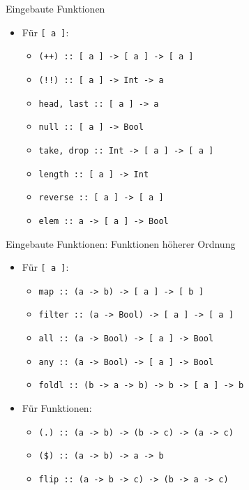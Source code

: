\documentclass{beamer}
\begin{document}
\begin{frame}{Eingebaute Funktionen}
	\begin{itemize}
		\item Für \texttt{[ a ]}:
		\begin{itemize}
			\item \texttt{(++) :: [ a ] -> [ a ] -> [ a ]}
			\item \texttt{(!!) :: [ a ] -> Int -> a}
			\item \texttt{head, last :: [ a ] -> a}
			\item \texttt{null :: [ a ] -> Bool}
			\item \texttt{take, drop :: Int -> [ a ] -> [ a ]}
			\item \texttt{length :: [ a ] -> Int}
			\item \texttt{reverse :: [ a ] -> [ a ]}
			\item \texttt{elem :: a -> [ a ] -> Bool}
		\end{itemize}
	\end{itemize}
\end{frame}

\begin{frame}{Eingebaute Funktionen: Funktionen höherer Ordnung}
	\begin{itemize}
		\item Für \texttt{[ a ]}:
		\begin{itemize}
			\item \texttt{map :: (a -> b) -> [ a ] -> [ b ]}
			\item \texttt{filter :: (a -> Bool) -> [ a ] -> [ a ]}
			\pause
			\item \texttt{all :: (a -> Bool) -> [ a ] -> Bool}
			\item \texttt{any :: (a -> Bool) -> [ a ] -> Bool}
			\pause
			\item \texttt{foldl :: (b -> a -> b) -> b -> [ a ] -> b}
		\end{itemize}
		\pause
		\item Für Funktionen:
		\begin{itemize}
			\item \texttt{(.) :: (a -> b) -> (b -> c) -> (a -> c)}
			\item \texttt{(\$) :: (a -> b) -> a -> b}
			\item \texttt{flip :: (a -> b -> c) -> (b -> a -> c)}
		\end{itemize}
	\end{itemize}
\end{frame}
\end{document}
